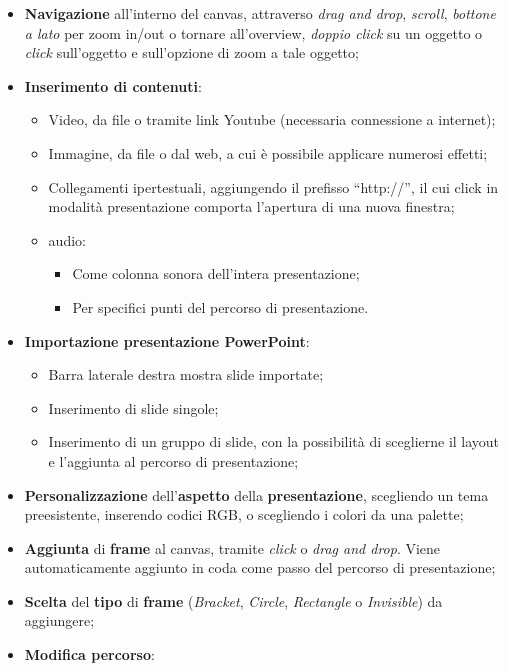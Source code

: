 \begin{itemize}
  \item \textbf{Navigazione} all'interno del canvas, attraverso \emph{drag and drop}, \emph{scroll}, \emph{bottone a lato} per zoom in/out o tornare all'overview, 
  \emph{doppio click} su un oggetto o \emph{click} sull'oggetto e sull'opzione di zoom a tale oggetto;
  \item \textbf{Inserimento di contenuti}:
  \begin{itemize}
   \item Video, da file o tramite link Youtube (necessaria connessione a internet);
   \item Immagine, da file o dal web, a cui è possibile applicare numerosi effetti;
   \item Collegamenti ipertestuali, aggiungendo il prefisso ``http://'', il cui click in modalità presentazione comporta l'apertura di una nuova finestra;
   \item audio:
   \begin{itemize}
    \item Come colonna sonora dell'intera presentazione;
    \item Per specifici punti del percorso di presentazione.
   \end{itemize}
  \end{itemize}
  \item \textbf{Importazione presentazione PowerPoint}:
  \begin{itemize}
   \item Barra laterale destra mostra slide importate;
   \item Inserimento di slide singole;
   \item Inserimento di un gruppo di slide, con la possibilità di sceglierne il layout e l'aggiunta al percorso di presentazione;
  \end{itemize}
  \item \textbf{Personalizzazione} dell'\textbf{aspetto} della \textbf{presentazione}, 
  scegliendo un tema preesistente, inserendo codici RGB, o scegliendo i colori da una palette;
  \item \textbf{Aggiunta} di \textbf{frame} al canvas, tramite \emph{click} o \emph{drag and drop}. 
  Viene automaticamente aggiunto in coda come passo del percorso di presentazione;
  \item \textbf{Scelta} del \textbf{tipo} di \textbf{frame} (\emph{Bracket}, \emph{Circle}, \emph{Rectangle} o \emph{Invisible}) da aggiungere;
  \item \textbf{Modifica percorso}:

\end{itemize}
